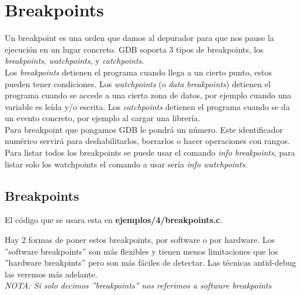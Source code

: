 \section{Breakpoints}
Un breakpoint es una orden que damos al depurador para que nos pause la ejecución en un lugar concreto. GDB soporta 3 tipos de breakpoints, los \emph{breakpoints}, \emph{watchpoints}, y \emph{catchpoints}.\\
Los \emph{breakpoints} detienen el programa cuando llega a un cierto punto, estos pueden tener condiciones. Los \emph{watchpoints} (o \emph{data breakpoints}) detienen el programa cuando se accede a una cierta zona de datos, por ejemplo cuando una variable es leída y/o escrita. Los \emph{catchpoints} detienen el programa cuando se da un evento concreto, por ejemplo al cargar una librería.\\

Para breakpoint que pongamos GDB le pondrá un número. Este identificador numérico servirá para deshabilitarlos, borrarlos o hacer operaciones con rangos.\\
Para listar todos los breakpoints se puede usar el comando \emph{info breakpoints}, para listar solo los watchpoints el comando a usar sería \emph{info watchpoints}.

\subsection{Breakpoints} %
El código que se usara esta en \textbf{ejemplos/4/breakpoints.c}.

Hay 2 formas de poner estos breakpoints, por software o por hardware. Los ''software breakpoints'' son más flexibles y tienen menos limitaciones que los ''hardware breakpints'' pero son más fáciles de detectar. Las técnicas antid-debug las veremos más adelante.\\
\emph{NOTA: Si solo decimos ''breakpoints'' nos referimos a software breakpoints}\\

